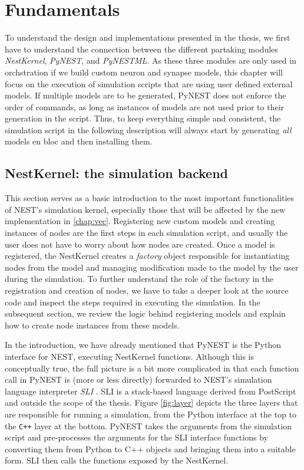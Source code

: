 \chapter{Fundamentals}
\label{chap:funds}


To understand the design and implementations presented in the thesis, we first have to understand the connection between the different partaking modules \emph{NestKernel}, \emph{PyNEST}, and \emph{PyNESTML}. As these three modules are only used in orchstration if we build custom neuron and synapse models, this chapter will focus on the execution of simulation scripts that are using user defined external models. If multiple models are to be generated, PyNEST does not enforce the order of commands, as long as instances of models are not used prior to their generation in the script. Thus, to keep everything simple and consistent, the simulation script in the following description will always start by generating \emph{all} models en bloc and then installing them.

\section{NestKernel: the simulation backend}

This section serves as a basic introduction to the most important functionalities of NEST's simulation kernel, especially those that will be affected by the new implementation in \autoref{chap:vec}. Registering new custom models and creating instances of nodes are the first steps in each simulation script, and usually the user does not have to worry about how nodes are created. Once a model is registered, the NestKernel creates a \emph{factory} object responsible for instantiating nodes from the model and managing modification made to the model by the user during the simulation. To further understand the role of the factory in the registration and creation of nodes, we have to take a deeper look at the source code and inspect the steps required in executing the simulation. In the subsequent section, we review the logic behind registering models and explain how to create node instances from these models.

In the introduction, we have already mentioned that PyNEST is the Python interface for NEST, executing NestKernel functions. Although this is conceptually true, the full picture is a bit more complicated in that each function call in PyNEST is (more or less directly) forwarded to NEST's simulation language interpreter \emph{SLI} \citep{gewaltig2007nest}. SLI is a stack-based language derived from PostScript \citep{adobe1990postscript} and outside the scope of the thesis. Figure \ref{fig:layer} depicts the three layers that are responsible for running a simulation, from the Python interface at the top to the \texttt{C++} layer at the bottom. PyNEST takes the arguments from the simulation script and pre-processes the arguments for the SLI interface functions by converting them from Python to C++ objects and bringing them into a suitable form. SLI then calls the functions exposed by the NestKernel.

